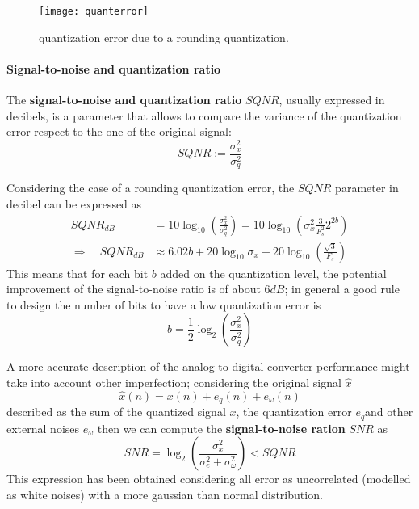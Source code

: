 			\begin{SCfigure}[2][bht]
				\centering
				\texttt{[image: quanterror]}
				\caption{quantization error due to a rounding quantization.} \label{fig:conv:quantizationerror}
			\end{SCfigure}
			
			\paragraph{Signal-to-noise and quantization ratio} The \textbf{signal-to-noise and quantization ratio} $SQNR$, usually expressed in decibels, is a parameter that allows to compare the variance of the quantization error respect to the one of the original signal:
			\begin{equation}
				SQNR := \frac{\sigma_x^2}{\sigma_q^2}
			\end{equation}
			
			Considering the case of a rounding quantization error, the $SQNR$ parameter in decibel can be expressed as
			\begin{equation}
			\begin{aligned}
				SQNR_{dB} & = 10 \log_10\left(\frac{\sigma_x^2}{\sigma_q^2}\right) = 10 \log_{10} \left( \sigma_x^2 \frac 3 {F_s^2} 2^{2b} \right) \\ \Rightarrow \quad SQNR_{dB}  & \approx 6.02b + 20\log_{10}\sigma_x + 20\log_{10} \left( \frac{\sqrt 3}{F_s} \right)
			\end{aligned}
			\end{equation}
			This means that for each bit $b$ added on the quantization level, the potential improvement of the signal-to-noise ratio is of about $6dB$; in general a good rule to design the number of bits to have a low quantization error is
			\begin{equation}
				b = \frac 1 2 \log_2 \left( \frac{\sigma_x^2}{\sigma_q^2} \right)
			\end{equation}
			
			A more accurate description of the analog-to-digital converter performance might take into account other imperfection; considering the original signal $\hat x$
			\[ \hat x(n) = x(n) + e_q(n) + e_\omega(n) \]
			described as the sum of the quantized signal $x$, the quantization error $e_q$and other external noises $e_\omega$ then we can compute the \textbf{signal-to-noise ration} $SNR$ as
			\begin{equation}
				SNR = \log_2 \left( \frac{\sigma_x^2}{\sigma_e^2 + \sigma_\omega^2} \right) < SQNR
			\end{equation}
			This expression has been obtained considering all error as uncorrelated (modelled as white noises) with a more gaussian than normal distribution.
			
